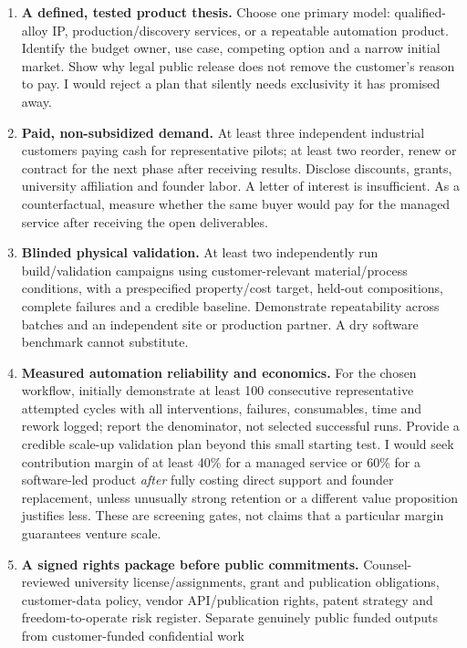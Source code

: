 \begin{enumerate}
\def\labelenumi{\arabic{enumi}.}
\tightlist
\item
  \textbf{A defined, tested product thesis.} Choose one primary model:
  qualified-alloy IP, production/discovery services, or a repeatable
  automation product. Identify the budget owner, use case, competing
  option and a narrow initial market. Show why legal public release does
  not remove the customer's reason to pay. I would reject a plan that
  silently needs exclusivity it has promised away.
\item
  \textbf{Paid, non-subsidized demand.} At least three independent
  industrial customers paying cash for representative pilots; at least
  two reorder, renew or contract for the next phase after receiving
  results. Disclose discounts, grants, university affiliation and
  founder labor. A letter of interest is insufficient. As a
  counterfactual, measure whether the same buyer would pay for the
  managed service after receiving the open deliverables.
\item
  \textbf{Blinded physical validation.} At least two independently run
  build/validation campaigns using customer-relevant material/process
  conditions, with a prespecified property/cost target, held-out
  compositions, complete failures and a credible baseline. Demonstrate
  repeatability across batches and an independent site or production
  partner. A dry software benchmark cannot substitute.
\item
  \textbf{Measured automation reliability and economics.} For the chosen
  workflow, initially demonstrate at least 100 consecutive
  representative attempted cycles with all interventions, failures,
  consumables, time and rework logged; report the denominator, not
  selected successful runs. Provide a credible scale-up validation plan
  beyond this small starting test. I would seek contribution margin of
  at least 40\% for a managed service or 60\% for a software-led product
  \emph{after} fully costing direct support and founder replacement,
  unless unusually strong retention or a different value proposition
  justifies less. These are screening gates, not claims that a
  particular margin guarantees venture scale.
\item
  \textbf{A signed rights package before public commitments.}
  Counsel-reviewed university license/assignments, grant and publication
  obligations, customer-data policy, vendor API/publication rights,
  patent strategy and freedom-to-operate risk register. Separate
  genuinely public funded outputs from customer-funded confidential work

\end{enumerate}
